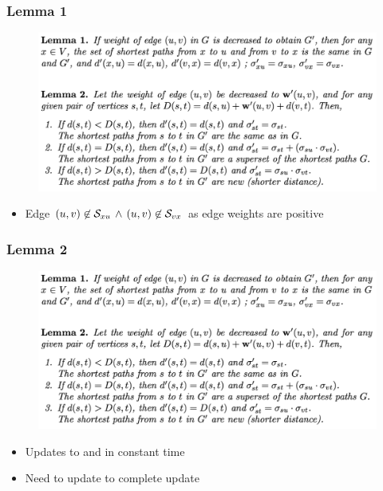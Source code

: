 \begin{frame}
  \frametitle{Lemma 1}

  \begin{figure}[H]
    \centering
    \includegraphics[width=\textwidth, trim={0 8cm 0 0}, clip]{imgs/npr14-lemmas}
  \end{figure}
  
  \begin{itemize}
    \item Edge $(u,v) \not\in \mathcal{S}_{xu} \, \wedge \, (u,v)\not\in \mathcal{S}_{vx}$ as edge weights are positive
  \end{itemize}
\end{frame}


\begin{frame}
  \frametitle{Lemma 2}

  \begin{figure}[H]
    \centering
    \includegraphics[width=\textwidth, trim={0 0 0 3.5cm}, clip]{imgs/npr14-lemmas}
  \end{figure}
  
  \begin{itemize}
    \item Updates to \paths and \dist in constant time
    \item Need to update \pred to complete \spdag update
  \end{itemize}
\end{frame}


